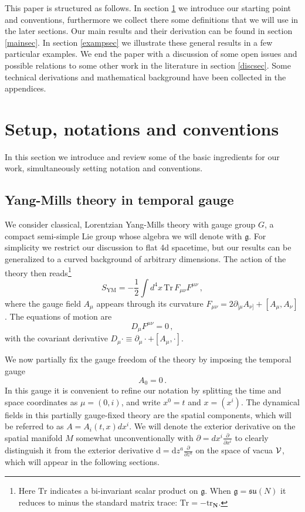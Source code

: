 \documentclass[11pt,a4paper]{article}
\def\calv{{\cal V}}
\def\mn{{\mu\nu}}
\def\pd{\partial}
\def\rd{{\mathrm{d}}}
\def\Tr{\mathrm{Tr}}
\def\tr{\mathrm{tr}}
\def\grad{{\partial}}
\begin{document}
    This paper is structured as follows. In section \ref{setupsec} we introduce our starting point and conventions, furthermore we collect there some definitions that we will use in the later sections. Our main results and their derivation can be found in section \ref{mainsec}. In section \ref{exampsec} we illustrate these general results in a few particular examples. We end the paper with a discussion of some open issues and possible relations to some other work in the literature in section \ref{discsec}. Some technical derivations and mathematical background have been collected in the appendices.
        
    \section{Setup, notations and conventions}\label{setupsec}
    In this section we introduce and review some of the basic ingredients for our work, simultaneously setting notation and conventions.
    \subsection{Yang-Mills theory in temporal gauge}
    We consider classical, Lorentzian Yang-Mills theory with gauge group $G$, a compact semi-simple Lie group whose algebra we will denote with $\mathfrak{g}$. For simplicity we restrict our discussion to flat 4d spacetime, but our results can be generalized to a curved background of arbitrary dimensions. The action of the theory then reads\footnote{Here $\Tr$ indicates a bi-invariant scalar product on $\mathfrak{g}$. When $\mathfrak{g}=\mathfrak{su}(N)$ it reduces to minus the standard matrix trace: $\Tr=-\tr_\mathbf{N}$.} 
    \begin{equation}\label{actionYM}
    S_\mathrm{YM}=-\frac{1}{2}\int\!d^4 x\, \Tr\, F_{\mu\nu}F^{\mu\nu}\,,
    \end{equation}
    where the gauge field $A_\mu$ appears through its curvature $F_{\mn}=2\partial_{[\mu}A_{\nu]}+[A_\mu,A_\nu]$.  
    The equations of motion are
    \begin{equation}
    D_\mu F^{\mn}=0\label{covYMeoms}\,,
    \end{equation}
    with the covariant derivative $D_\mu\cdot\equiv\partial_\mu\cdot+[A_\mu,\cdot]$. 
    
    We now partially fix the gauge freedom of the theory by imposing the temporal gauge
    \begin{equation}
    A_0=0\,.\label{tempgauge}
    \end{equation}
     In this gauge it is convenient to refine our notation by splitting the time and space coordinates as $\mu=(0,i)$, and write $x^0=t$ and $x=(x^i)$. The dynamical fields in this partially gauge-fixed theory are  the spatial components, which will be referred to as $A=A_i(t,x)dx^i$. We will denote the exterior derivative on the spatial manifold $M$ somewhat unconventionally with $\grad=dx^i\frac{\pd}{\pd x^i}$ to clearly distinguish it from the exterior derivative $\rd=\rd z^a\frac{\pd}{\pd z^a}$ on the space of vacua $\calv$, which will appear in the following sections.
    
\end{document}

